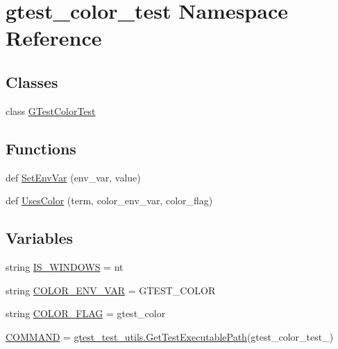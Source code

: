 \hypertarget{namespacegtest__color__test}{}\section{gtest\+\_\+color\+\_\+test Namespace Reference}
\label{namespacegtest__color__test}
\subsection*{Classes}
\begin{DoxyCompactItemize}
\item 
class \hyperlink{classgtest__color__test_1_1_g_test_color_test}{G\+Test\+Color\+Test}
\end{DoxyCompactItemize}
\subsection*{Functions}
\begin{DoxyCompactItemize}
\item 
def \hyperlink{namespacegtest__color__test_af8659dcaaf59478690f30d7ac141b1c4}{Set\+Env\+Var} (env\+\_\+var, value)
\item 
def \hyperlink{namespacegtest__color__test_a96a2e5fa77bff1cba4a791ad1e5bdafa}{Uses\+Color} (term, color\+\_\+env\+\_\+var, color\+\_\+flag)
\end{DoxyCompactItemize}
\subsection*{Variables}
\begin{DoxyCompactItemize}
\item 
string \hyperlink{namespacegtest__color__test_a0d4451a99f88105308f0842eb3ec2938}{I\+S\+\_\+\+W\+I\+N\+D\+O\+WS} = \textquotesingle{}nt\textquotesingle{}
\item 
string \hyperlink{namespacegtest__color__test_aa6deaa7da27bcc115fe666abad13419c}{C\+O\+L\+O\+R\+\_\+\+E\+N\+V\+\_\+\+V\+AR} = \textquotesingle{}G\+T\+E\+S\+T\+\_\+\+C\+O\+L\+OR\textquotesingle{}
\item 
string \hyperlink{namespacegtest__color__test_af5818cea608c0551909fefbeaf0edf20}{C\+O\+L\+O\+R\+\_\+\+F\+L\+AG} = \textquotesingle{}gtest\+\_\+color\textquotesingle{}
\item 
\hyperlink{namespacegtest__color__test_a5b2d1937052a86cc99b722dd0db8e4fc}{C\+O\+M\+M\+A\+ND} = \hyperlink{namespacegtest__test__utils_a89ed3717984a80ffbb7a9c92f71b86a2}{gtest\+\_\+test\+\_\+utils.\+Get\+Test\+Executable\+Path}(\textquotesingle{}gtest\+\_\+color\+\_\+test\+\_\+\textquotesingle{})
\end{DoxyCompactItemize}


